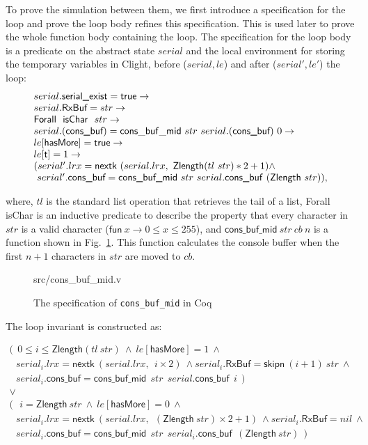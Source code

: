 To prove the simulation between them, we first introduce a specification for the
loop and prove the loop body refines this specification. This is used later to
prove the whole function body containing the loop. The specification for the
loop body is a predicate on the abstract state $serial$ and the local
environment for storing the temporary variables in Clight, before ($serial, le$)
and after ($serial', le'$) the loop:
\[
\begin{array}{l}
	serial.\textsf{serial\_exist} = \textsf{true} \rightarrow \\
	serial.\textsf{RxBuf} = str \rightarrow \\
	\textsf{Forall}~~ \textsf{isChar}~~ str \rightarrow \\
	serial.(\textsf{cons\_buf}) = \mathsf{cons\_buf\_mid}~ str~ serial.(\textsf{cons\_buf})~ 0 \rightarrow \\
	le[\textsf{hasMore}] = \textsf{true} \rightarrow \\
	le[\textsf{t}] = 1 \rightarrow \\
	(serial'.lrx = \textsf{nextk} ~(serial.lrx, ~\textsf{Zlength} (tl~ str) * 2 + 1) \wedge \\
	 ~serial'.\textsf{cons\_buf} = \textsf{cons\_buf\_mid}~ str~ serial.\textsf{\textsf{cons\_buf}}~ (\textsf{Zlength}~ str)),
\end{array}
\]

\noindent{}where, $tl$ is the standard list operation that retrieves the tail of
a list, \textsf{Forall  isChar} is an inductive predicate to describe the
property that every character in $str$ is a valid character ($\textsf{fun}~x
\rightarrow 0 \le x \le 255$), and $\textsf{cons\_buf\_mid}~ str~ cb~ n$ is a
function shown in Fig.~\ref{fig:cons_buf_mid_v}. This function calculates the
console buffer when the first $n+1$ characters in $str$ are moved to $cb$.

\begin{figure}
	 {src/cons_buf_mid.v}
	\caption{The specification of \texttt{cons\_buf\_mid} in Coq}
	\label{fig:cons_buf_mid_v}
\end{figure}

The loop invariant is constructed as:

\[
\begin{array}{l}
	(~~0 \le i \le \textsf{Zlength} (tl~ str)~\wedge~
	le[\textsf{hasMore}] = 1 ~\wedge \\
	~~~serial_{i}.lrx = \textsf{nextk}~ (serial.lrx, ~~i \times 2) ~\wedge 
	serial_{i}.\textsf{RxBuf} = \textsf{skipn}~(i + 1)~str ~\wedge\\
	~~~serial_{i}.\textsf{cons\_buf} = \textsf{cons\_buf\_mid} ~~str ~~serial.\textsf{cons\_buf} ~~i~~) \\
	\vee \\
	(~~~i = \textsf{Zlength}~ str ~\wedge
	~le[\textsf{hasMore}] = 0 ~\wedge \\
	~~~serial_{i}.lrx = \textsf{nextk} ~(serial.lrx, ~~(\textsf{Zlength}~ str) \times 2 + 1) ~\wedge
	serial_{i}.\textsf{RxBuf} = nil ~\wedge \\
	~~~serial_{i}.\textsf{cons\_buf} = \textsf{cons\_buf\_mid}~~ str~~ serial_{i}.\textsf{cons\_buf}~~ (\textsf{Zlength}~ str)~~)
\end{array}
\]

